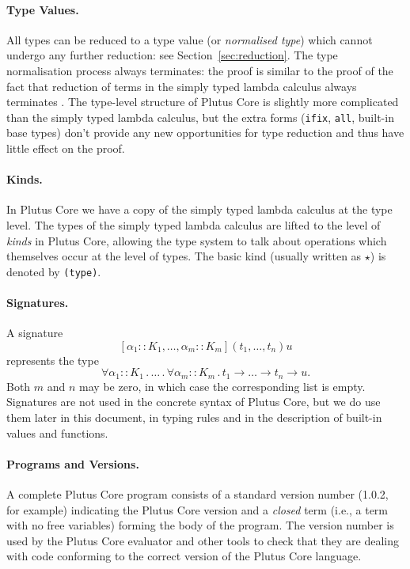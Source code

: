 \documentclass[a4paper]{article}
\begin{document}
\paragraph{Type Values.} All types can be reduced to a type value (or
  \textit{normalised type}) which cannot undergo any further
  reduction: see Section~\ref{sec:reduction}.  The type normalisation
  process always terminates: the proof is similar to the proof of the
  fact that reduction of terms in the simply typed lambda calculus
  always terminates \citep[\S12]{Pierce:TAPL}.  The type-level
  structure of Plutus Core is slightly more complicated than the
  simply typed lambda calculus, but the extra forms (\texttt{ifix},
  \texttt{all}, built-in base types) don't provide any new
  opportunities for type reduction and thus have little effect on the
  proof.

\paragraph{Kinds.} In Plutus Core we have a copy of the
simply typed lambda calculus at the type level. The types of the
simply typed lambda calculus are lifted to the level of
\textit{kinds} in Plutus Core, allowing the type system to talk about
operations which themselves occur at the level of types.
The basic kind (usually written as $\star$) is denoted by \texttt{(type)}.

\paragraph{Signatures.}  A signature
$$[\alpha_1::K_1, \ldots, \alpha_m::K_m](t_1, \ldots, t_n)u$$ represents
the type
$$\forall \alpha_1::K_1\,.\, \ldots \,.\, \forall \alpha_m::K_m\,.\, t_1
\rightarrow \ldots \rightarrow t_n \rightarrow u.$$
Both $m$ and $n$
may be zero, in which case the corresponding list is empty.
Signatures are not used in the concrete syntax of Plutus Core, but we
do use them later in this document, in typing rules and in the
description of built-in values and functions.

\paragraph{Programs and Versions.} A complete Plutus Core program
consists of a standard version number (1.0.2, for example) indicating
the Plutus Core version and a \textit{closed} term (i.e., a term with no
free variables) forming the body of the program.  The version number
is used by the Plutus Core evaluator and other tools to check that
they are dealing with code conforming to the correct version of the
Plutus Core language.
\end{document}
